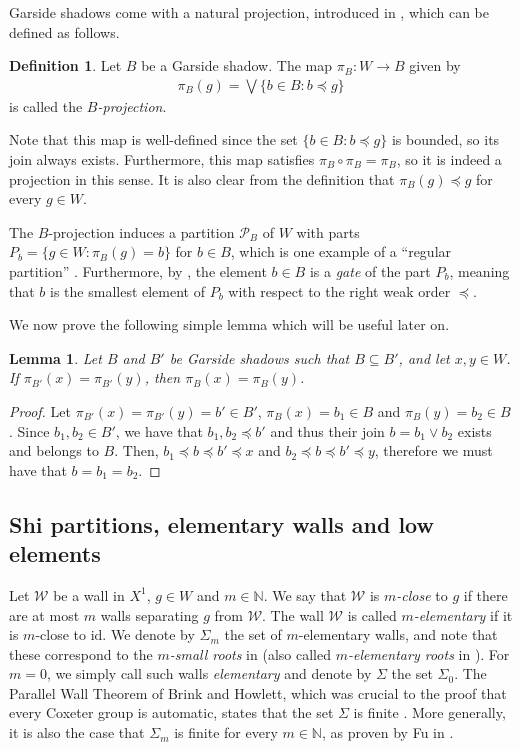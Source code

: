 \documentclass[a4paper,12pt,leqno]{amsart}
\newtheorem{lemma}[theorem]{Lemma}
\theoremstyle{definition}
\newtheorem{defin}[theorem]{Definition}
\newcommand{\N}{\mathbb{N}}
\newcommand{\W}{\mathcal{W}}
\newcommand{\id}{\text{id}}
\begin{document}
Garside shadows come with a natural projection, introduced in \cite{HNW-Gar}, which can be defined as follows.
\begin{defin}
    Let $B$ be a Garside shadow. The map $\pi_B : W \to B$ given by
    \begin{align*}
        \pi_B(g) = \bigvee\{b \in B : b \preceq g\}
    \end{align*}
    is called the $B$\emph{-projection}.
\end{defin}

Note that this map is well-defined since the set $\{b \in B : b \preceq g\}$ is bounded, so its join always exists. Furthermore, this map satisfies $\pi_B \circ \pi_B = \pi_B$, so it is indeed a projection in this sense. It is also clear from the definition that $\pi_B(g) \preceq g$ for every $g \in W$.

The $B$-projection induces a partition $\mathscr{P}_B$ of $W$ with parts $P_b = \{g \in W : \pi_B(g) = b\}$ for $b \in B$, which is one example of a ``regular partition'' \cite[Def 3.10]{PaY-reg}. Furthermore, by \cite[Lem 4.17]{PaY-reg}, the element $b \in B$ is a \emph{gate} of the part $P_b$, meaning that $b$ is the smallest element of $P_b$ with respect to the right weak order $\preceq$. 

We now prove the following simple lemma which will be useful later on.

\begin{lemma} \label{refinement}
    Let $B$ and $B'$ be Garside shadows such that $B \subseteq B'$, and let $x,y \in W$. If $\pi_{B'}(x) = \pi_{B'}(y)$, then $\pi_B(x) = \pi_B(y)$. 
\end{lemma}

\begin{proof}
    Let $\pi_{B'}(x) = \pi_{B'}(y) = b' \in B'$, $\pi_B(x) = b_1 \in B$ and $\pi_B(y) = b_2 \in B$. Since $b_1,b_2 \in B'$, we have that $b_1,b_2 \preceq b'$ and thus their join $b = b_1 \vee b_2$ exists and belongs to $B$. Then, $b_1 \preceq b \preceq b' \preceq x$ and $b_2 \preceq b \preceq b' \preceq y$, therefore we must have that $b = b_1 = b_2$.
\end{proof}

\subsection{Shi partitions, elementary walls and low elements} \label{subsection Shi}

Let $\W$ be a wall in $X^1$, $g \in W$ and $m \in \N$. We say that $\W$ is $m$\emph{-close} to $g$ if there are at most $m$ walls separating $g$ from $\W$. The wall $\W$ is called $m$\emph{-elementary} if it is $m$-close to $\id$. We denote by $\Sigma_m$ the set of $m$-elementary walls, and note that these correspond to the $m$\emph{-small roots} in \cite{DHFM24} (also called $m$\emph{-elementary roots} in \cite{BH-par, Fu-E_m}). For $m=0$, we simply call such walls \emph{elementary} and denote by $\Sigma$ the set $\Sigma_0$. The Parallel Wall Theorem of Brink and Howlett, which was crucial to the proof that every Coxeter group is automatic, states that the set $\Sigma$ is finite \cite{BH-par}. More generally, it is also the case that $\Sigma_m$ is finite for every $m \in \N$, as proven by Fu in \cite{Fu-E_m}. 
\end{document}
